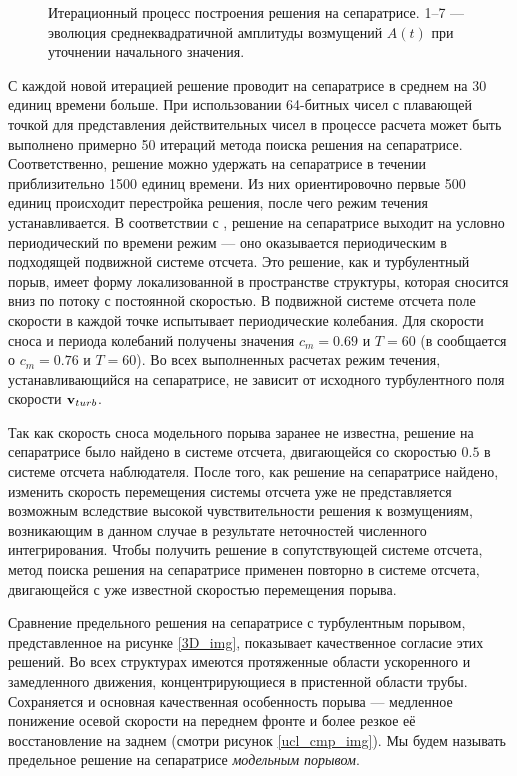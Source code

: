 \begin{figure}
\caption{Итерационный процесс построения решения на сепаратрисе. 1--7 --- эволюция среднеквадратичной амплитуды возмущений $A(t)$ при уточнении начального
значения.}
\label{bisection_pic}
\end{figure}

С каждой новой итерацией решение проводит на сепаратрисе в среднем на 30 единиц времени больше. При использовании 64-битных чисел с плавающей точкой для представления действительных чисел в процессе расчета может быть выполнено примерно 50 итераций метода поиска решения на сепаратрисе. Соответственно, решение можно удержать на сепаратрисе в течении приблизительно 1500 единиц времени. Из них ориентировочно первые 500 единиц происходит перестройка решения, после чего режим течения устанавливается. В соответствии с \cite{Avila2013}, решение на сепаратрисе выходит на условно периодический по времени режим --- оно оказывается периодическим в подходящей подвижной системе отсчета. Это решение, как и турбулентный порыв, имеет форму локализованной в пространстве структуры, которая сносится вниз по потоку с постоянной скоростью. В подвижной системе отсчета поле скорости в каждой точке испытывает периодические колебания. Для скорости сноса и периода колебаний получены значения $c_m=0.69$ и $T=60$ (в \cite{Avila2013} сообщается о $c_m=0.76$ и $T=60$). Во всех выполненных расчетах режим течения, устанавливающийся на сепаратрисе, не зависит от исходного турбулентного поля скорости $\mathbf{v}_{turb}$. 

Так как скорость сноса модельного порыва заранее не известна, решение на сепаратрисе было найдено в системе отсчета, двигающейся со скоростью $0.5$ в системе отсчета наблюдателя. После того, как решение на сепаратрисе найдено, изменить скорость перемещения системы отсчета уже не представляется возможным вследствие высокой чувствительности решения к возмущениям, возникающим в данном случае в результате неточностей численного интегрирования. Чтобы получить решение в сопутствующей системе отсчета, метод поиска решения на сепаратрисе применен повторно в системе отсчета, двигающейся с уже известной скоростью перемещения порыва. 

Сравнение предельного решения на сепаратрисе с турбулентным порывом, представленное на рисунке \ref{3D_img}, показывает качественное согласие этих решений. Во всех структурах имеются протяженные области ускоренного и замедленного движения, концентрирующиеся в пристенной области трубы. Сохраняется и основная качественная особенность порыва --- медленное понижение осевой скорости на переднем фронте и более резкое её восстановление на заднем (смотри рисунок \ref{ucl_cmp_img}). Мы будем называть предельное решение на сепаратрисе {\it модельным порывом}.  

